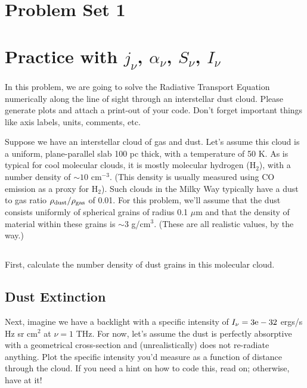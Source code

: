 \documentclass[11pt]{article}
\def\e{{\rm e}}
\begin{document}
\pagestyle{empty}
\parindent=0pt

\section*{\centering Problem Set 1}

\section{Practice with $j_\nu$, $\alpha_\nu$, $S_\nu$, $I_\nu$}

In this problem, we are going to solve the Radiative Transport Equation numerically along the line of
sight through an interstellar dust cloud.  Please generate plots and attach a print-out of your code.
Don't forget important things like axis labels, units, comments, etc.

Suppose we have an interstellar cloud of gas and dust.  Let's assume this
cloud is a uniform, plane-parallel slab 100 pc thick, with a temperature of 50 K.  As
is typical for cool molecular clouds, it is mostly molecular hydrogen (H$_2$), with a number density
of $\sim 10$ cm$^{-3}$. (This density is usually measured using CO emission as a proxy for H$_2$).  
Such clouds in the Milky Way typically have a dust to gas
ratio $\rho_{\rm dust}/\rho_{\rm gas}$ of 0.01.  For this problem, we'll assume that the dust consists
uniformly of spherical grains of radius 0.1 $\mu$m and that the density of material within these
grains is $\sim$3 g/cm$^3$.  (These are all realistic values, by the way.)

\subsection{}

First, calculate the number density of dust grains in this molecular cloud.

\subsection{Dust Extinction}

Next, imagine we have a backlight with a specific intensity of $I_\nu=3\e-32$ ergs/s Hz sr cm$^2$ at $\nu=1$ THz.
For now, let's assume the dust is perfectly absorptive with a geometrical cross-section and 
(unrealistically) does not re-radiate anything.  Plot
the specific intensity you'd measure as a function of distance through the cloud.  
If you need a hint on how to code this, read on; otherwise, have at it!
\end{document}
